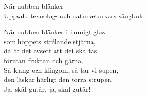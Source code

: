 
  {\Large När nubben blänker}\\{\tiny  Uppsala teknolog- och naturvetarkårs sångbok}
  \begin{vers}
När nubben blänker i immigt glas \\
som hoppets strålande stjärna, \\
då är det avsett att det ska tas \\
förutan fruktan och gärna. \\
Så klang och klingom, så tar vi supen, \\
den läskar härligt den torra strupen. \\
Ja, skål gutår, ja, skål gutår! \\
\end{vers}
 